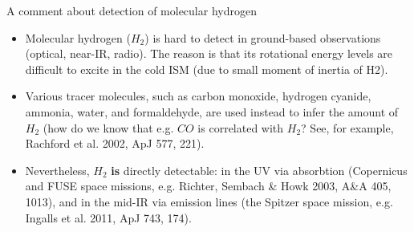\documentclass[letterpaper,landscape]{slides}
\begin{document}
\begin{slide}
\begin{center}
{\large \color{red} A comment about detection of molecular hydrogen}
\end{center}

\begin{itemize}
\item Molecular hydrogen ($H_2$) is hard to detect in ground-based observations 
(optical, near-IR, radio). The reason is that its rotational energy levels are difficult 
to excite in the cold ISM (due to small moment of inertia of H2). 
\item Various tracer molecules, such as carbon monoxide, hydrogen cyanide, ammonia, water, 
and formaldehyde, are used instead to infer the amount of $H_2$ (how do we know that e.g. 
$CO$ is correlated with $H_2$?  See, for example, 	Rachford et al. 2002, ApJ 577, 221). 
\item Nevertheless, {\color{blue} $H_2$ {\bf is} directly detectable:} in the UV via absorbtion
(Copernicus and FUSE space missions, e.g. Richter, Sembach \& Howk 2003, A\&A 405, 1013), 
and in the mid-IR via emission lines (the Spitzer space mission, e.g. Ingalls et al. 2011, 
ApJ 743, 174).
\end{itemize}          

\vfill
\end{slide}
\end{document}
